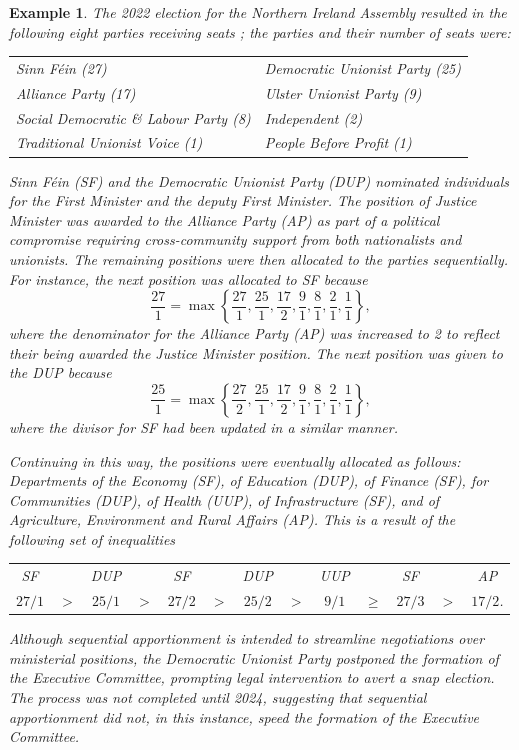 \documentclass[pdflatex,sn-mathphys-num]{sn-jnl}
\theoremstyle{thmstyleone}%
\theoremstyle{thmstyletwo}%
\newtheorem{example}{Example}%
\theoremstyle{thmstylethree}%
\begin{document}
\begin{example} \label{NIreland}
The 2022 election for the Northern Ireland Assembly resulted in the following  eight parties receiving seats \cite{BBC}; the parties and their number of seats were:

\vskip 2mm
\begin{tabular}{ll}
Sinn F\' ein  (27) &  Democratic Unionist Party (25) \\
Alliance Party (17) & Ulster Unionist Party (9) \\
Social Democratic \& Labour Party (8) &  Independent (2) \\  
Traditional Unionist Voice (1) &  People Before Profit (1) \end{tabular}

\vskip 2mm

Sinn F\' ein (SF) and the Democratic Unionist Party (DUP) nominated individuals for the First Minister and the deputy First Minister.  The position of Justice Minister was awarded to the Alliance Party (AP) as part of a political compromise requiring cross-community support from both nationalists and unionists.  The remaining positions were then allocated to the parties sequentially.  For instance, the next position was allocated to SF because
$$ \frac{27}{1} = \max\left\{\frac{27}{1} , \frac{25}{1},  \frac{17}{2}, \frac{9}{1}, \frac{8}{1} , \frac{2}{1}, \frac{1}{1} \right\},$$
where the denominator for the Alliance Party (AP) was increased to 2 to reflect their being awarded the Justice Minister position.
The  next position was given to the DUP because
$$ \frac{25}{1} = \max\left\{ \frac{27}{2},   \frac{25}{1}, \frac{17}{2}, \frac{9}{1}, \frac{8}{1} , \frac{2}{1}, \frac{1}{1} \right\},$$
where the divisor for SF had been updated in a similar manner.

Continuing in this way, the positions were eventually allocated as follows: Departments of the Economy (SF), of Education (DUP), of Finance (SF), for Communities (DUP), of Health (UUP), of Infrastructure (SF), and of Agriculture, Environment and Rural Affairs (AP).  
This is a result of the following set of inequalities
\vskip 2mm

\begin{tabular}{ccccccccccccc}
SF & & DUP & & SF & & DUP & & UUP & & SF & & AP \\
$27/1$ & $>$ & $25/1$ & $>$ & $27/2$ & $>$ & $25/2$ & $>$ & $9/1$ & $\ge$ & $27/3$ & $>$ & $17/2$.  \end{tabular}
\vskip 2mm

Although sequential apportionment is intended to streamline negotiations over ministerial positions, the Democratic Unionist Party postponed the formation of the Executive Committee, prompting legal intervention to avert a snap election. The process was not completed until 2024, suggesting that sequential apportionment did not, in this instance, speed the formation of the Executive Committee.\end{example}
\end{document}
